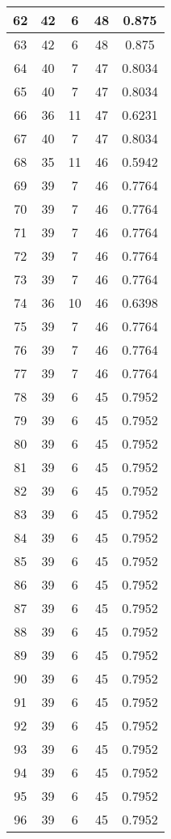 \documentclass[letterpaper, 12pt]{article}
\begin{document}
\begin{longtable}{|c|c|c|c|c|}
\hline
62 & 42 & 6 & 48 & 0.875 \\
\hline
63 & 42 & 6 & 48 & 0.875 \\
\hline
64 & 40 & 7 & 47 & 0.8034 \\
\hline
65 & 40 & 7 & 47 & 0.8034 \\
\hline
66 & 36 & 11 & 47 & 0.6231 \\
\hline
67 & 40 & 7 & 47 & 0.8034 \\
\hline
68 & 35 & 11 & 46 & 0.5942 \\
\hline
69 & 39 & 7 & 46 & 0.7764 \\
\hline
70 & 39 & 7 & 46 & 0.7764 \\
\hline
71 & 39 & 7 & 46 & 0.7764 \\
\hline
72 & 39 & 7 & 46 & 0.7764 \\
\hline
73 & 39 & 7 & 46 & 0.7764 \\
\hline
74 & 36 & 10 & 46 & 0.6398 \\
\hline
75 & 39 & 7 & 46 & 0.7764 \\
\hline
76 & 39 & 7 & 46 & 0.7764 \\
\hline
77 & 39 & 7 & 46 & 0.7764 \\
\hline
78 & 39 & 6 & 45 & 0.7952 \\
\hline
79 & 39 & 6 & 45 & 0.7952 \\
\hline
80 & 39 & 6 & 45 & 0.7952 \\
\hline
81 & 39 & 6 & 45 & 0.7952 \\
\hline
82 & 39 & 6 & 45 & 0.7952 \\
\hline
83 & 39 & 6 & 45 & 0.7952 \\
\hline
84 & 39 & 6 & 45 & 0.7952 \\
\hline
85 & 39 & 6 & 45 & 0.7952 \\
\hline
86 & 39 & 6 & 45 & 0.7952 \\
\hline
87 & 39 & 6 & 45 & 0.7952 \\
\hline
88 & 39 & 6 & 45 & 0.7952 \\
\hline
89 & 39 & 6 & 45 & 0.7952 \\
\hline
90 & 39 & 6 & 45 & 0.7952 \\
\hline
91 & 39 & 6 & 45 & 0.7952 \\
\hline
92 & 39 & 6 & 45 & 0.7952 \\
\hline
93 & 39 & 6 & 45 & 0.7952 \\
\hline
94 & 39 & 6 & 45 & 0.7952 \\
\hline
95 & 39 & 6 & 45 & 0.7952 \\
\hline
96 & 39 & 6 & 45 & 0.7952 \\

\end{longtable}
\end{document}
